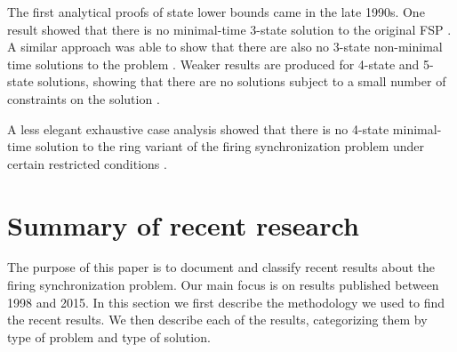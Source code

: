 \documentclass{article}
\begin{document}
The first analytical proofs of state lower bounds came in the late 1990s. One result showed that there is no minimal-time 3-state solution to the original FSP \cite{settle1999new}. A similar approach was able to show that there are also no 3-state non-minimal time solutions to the problem \cite{settle1999new}. Weaker results are produced for 4-state and 5-state solutions, showing that there are no solutions subject to a small number of constraints on the solution \cite{settle1999new}.

A less elegant exhaustive case analysis showed that there is no 4-state minimal-time solution to the ring variant of the firing synchronization problem under certain restricted conditions \cite{settle1999new}.


\section{Summary of recent research}
The purpose of this paper is to document and classify recent results about the firing synchronization problem. Our main focus is on results published between 1998 and 2015. In this section we first describe the methodology we used to find the recent results. We then describe each of the results, categorizing them by type of problem and type of solution.
\end{document}
